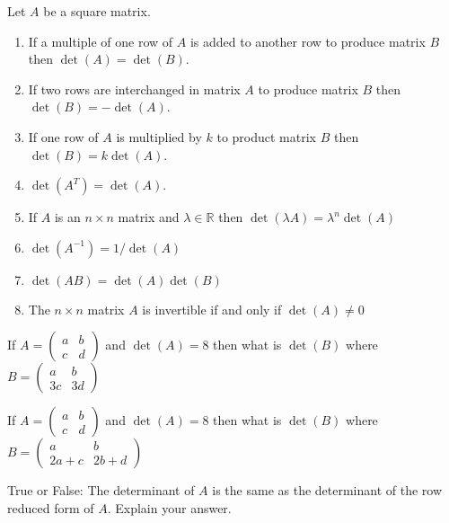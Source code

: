 \begin{thm}
    Let $A$ be a square matrix.
    \begin{enumerate}
        \item If a multiple of one row of $A$ is added to another row to produce matrix
            $B$ then $\det(A) = \det(B)$.
        \item If two rows are interchanged in matrix $A$ to produce matrix $B$ then
            $\det(B) = -\det(A)$.
        \item If one row of $A$ is multiplied by $k$ to product matrix $B$ then $\det(B) =
            k \det(A)$.
        \item $\det(A^T) = \det(A)$.
        \item If $A$ is an $n \times n$ matrix and $\lambda \in \mathbb{R}$ then $\det(\lambda A) = \lambda^n \det(A)$ 
        \item $\det(A^{-1}) = 1/\det(A)$
        \item $\det(AB) = \det(A) \det(B)$
        \item The $n \times n$ matrix $A$ is invertible if and only if $\det(A) \ne 0$
    \end{enumerate}
\end{thm}


\begin{problem}
    If $A = \begin{pmatrix} a & b \\ c & d \end{pmatrix}$ and $\det(A) = 8$ then what is
        $\det(B)$ where $B = \begin{pmatrix} a & b \\ 3c & 3d \end{pmatrix}$
\end{problem}


\begin{problem}
    If $A = \begin{pmatrix} a & b \\ c & d \end{pmatrix}$ and $\det(A) = 8$ then what is
    $\det(B)$ where $B = \begin{pmatrix} a & b \\ 2a+c & 2b + d \end{pmatrix}$    
\end{problem}


\begin{problem}
    True or False: The determinant of $A$ is the same as the determinant of the row
    reduced form of $A$.  Explain your answer.
\end{problem}


